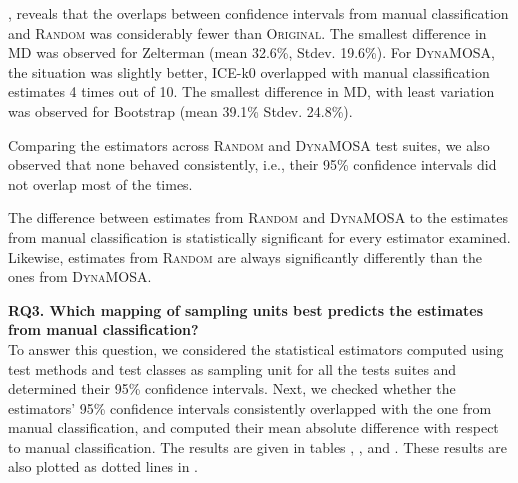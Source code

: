 \documentclass[sigconf,review,anonymous]{acmart}
\newcommand{\ICEallrare}{ICE-k0\xspace}
\newcommand{\Zelterman}{Zelterman\xspace}
\newcommand{\Evosuite}{\textsc{EvoSuite}\xspace}
\newcommand{\original}{\textsc{Original}\xspace}
\newcommand{\EvosuiteRandom}{\textsc{Random}\xspace}
\newcommand{\EvosuiteDynamosa}{\textsc{DynaMOSA}\xspace}
\begin{document}
, reveals that the overlaps between confidence intervals
from manual classification and \EvosuiteRandom was considerably fewer than \original.
The smallest difference in MD was observed for \Zelterman
(mean 32.6\%, Stdev. 19.6\%).
%
For \EvosuiteDynamosa, the situation was slightly better, \ICEallrare
overlapped with manual classification estimates 4 times out of 10.
The smallest difference in MD, with least variation was observed for
Bootstrap (mean 39.1\% Stdev. 24.8\%).

Comparing the estimators across \EvosuiteRandom and \EvosuiteDynamosa
test suites, we also observed that none behaved consistently, i.e.,
their 95\% confidence intervals did not overlap most of the times.

\begin{tcolorbox}[boxrule=0.5pt, arc=4pt, boxsep=0pt, width=\columnwidth]
The difference between estimates from \EvosuiteRandom and \EvosuiteDynamosa
to the estimates from manual classification is statistically significant for every estimator examined.
Likewise, estimates from \EvosuiteRandom are always significantly differently
than the ones from \EvosuiteDynamosa.
\end{tcolorbox}



\noindent\textbf{RQ3. Which mapping of sampling units best predicts the estimates
from manual classification?}\\ %
To answer this question, we considered the statistical estimators computed
using test methods and test classes as sampling unit for all the tests suites and
determined their 95\% confidence intervals.
%
Next, we checked whether the estimators' 95\% confidence intervals consistently
overlapped with the one from manual classification, and computed their mean absolute
difference with respect to manual classification.
%
The results are given in tables ,
, and .
These results are also plotted as dotted lines in .
\end{document}
